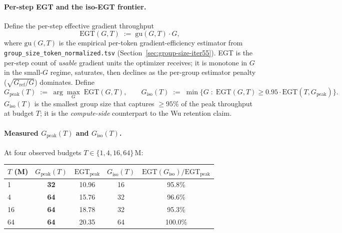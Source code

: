 \paragraph{Per-step EGT and the iso-EGT frontier.}
Define the per-step effective gradient throughput
\begin{equation}
  \mathrm{EGT}(G, T) \;:=\; \mathrm{gu}(G, T) \cdot G,
  \label{eq:iter83-egt}
\end{equation}
where $\mathrm{gu}(G, T)$ is the empirical per-token gradient-efficiency
estimator from \texttt{group\_size\_token\_normalized.tsv}
(Section~\ref{sec:group-size-iter55}).  EGT is the per-step count of
\emph{usable} gradient units the optimizer receives; it is monotone in
$G$ in the small-$G$ regime, saturates, then declines as the per-group
estimator penalty ($\sqrt{G_{\mathrm{ref}}/G}$) dominates.  Define
\begin{equation}
  G_{\mathrm{peak}}(T) \;:=\; \arg\max_{G}\;\mathrm{EGT}(G, T),
  \qquad
  G_{\mathrm{iso}}(T) \;:=\; \min\Big\{G \;:\;
      \mathrm{EGT}(G, T) \ge 0.95 \cdot \mathrm{EGT}(T, G_{\mathrm{peak}})\Big\}.
  \label{eq:iter83-gstar}
\end{equation}
$G_{\mathrm{iso}}(T)$ is the smallest group size that captures $\ge
95\%$ of the peak throughput at budget $T$; it is the
\emph{compute-side} counterpart to the Wu retention claim.

\paragraph{Measured $G_{\mathrm{peak}}(T)$ and $G_{\mathrm{iso}}(T)$.}
At four observed budgets $T \in \{1, 4, 16, 64\}\,\mathrm{M}$:

\begin{center}
\small
\begin{tabular}{lcccc}
\toprule
$T$ (M) & $G_{\mathrm{peak}}(T)$ & $\mathrm{EGT}_{\mathrm{peak}}$
        & $G_{\mathrm{iso}}(T)$ & $\mathrm{EGT}(G_{\mathrm{iso}})/\mathrm{EGT}_{\mathrm{peak}}$ \\
\midrule
  1 & \textbf{32} & 10.96 & 16 & 95.8\% \\
  4 & \textbf{64} & 15.76 & 32 & 96.6\% \\
 16 & \textbf{64} & 18.78 & 32 & 95.3\% \\
 64 & \textbf{64} & 20.35 & 64 & 100.0\% \\
\bottomrule
\end{tabular}
\end{center}

